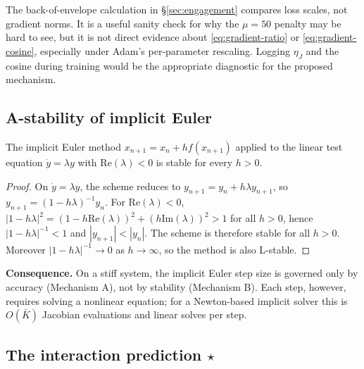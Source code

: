 The back-of-envelope calculation in \S\ref{sec:engagement} compares loss
scales, not gradient norms. It is a useful sanity check for why the
$\mu=50$ penalty may be hard to see, but it is not direct evidence about
\eqref{eq:gradient-ratio} or \eqref{eq:gradient-cosine}, especially under Adam's
per-parameter rescaling. Logging $\eta_J$ and the cosine during training would
be the appropriate diagnostic for the proposed mechanism.

\subsection{A-stability of implicit Euler}
\label{app:a-stability}

\begin{theorem}
\label{thm:a-stability}
The implicit Euler method $x_{n+1} = x_n + h f(x_{n+1})$ applied to the linear test
equation $\dot y = \lambda y$ with $\mathrm{Re}(\lambda) < 0$ is stable for every
$h > 0$.
\end{theorem}

\begin{proof}
On $\dot y = \lambda y$, the scheme reduces to $y_{n+1} = y_n + h \lambda y_{n+1}$,
so $y_{n+1} = (1 - h\lambda)^{-1} y_n$. For $\mathrm{Re}(\lambda) < 0$,
$|1 - h\lambda|^2 = (1 - h\mathrm{Re}(\lambda))^2 + (h\mathrm{Im}(\lambda))^2 > 1$
for all $h > 0$, hence $|1 - h\lambda|^{-1} < 1$ and $|y_{n+1}| < |y_n|$. The scheme
is therefore stable for all $h > 0$. Moreover $|1 - h\lambda|^{-1} \to 0$ as
$h \to \infty$, so the method is also L-stable.
\end{proof}

\textbf{Consequence.} On a stiff system, the implicit Euler step size is governed
only by accuracy (Mechanism A), not by stability (Mechanism B). Each step, however,
requires solving a nonlinear equation; for a Newton-based implicit solver this is
$O(\bar K)$ Jacobian evaluations and linear solves per step.

\subsection{The interaction prediction \texorpdfstring{$\star$}{star}}
\label{app:interaction}

